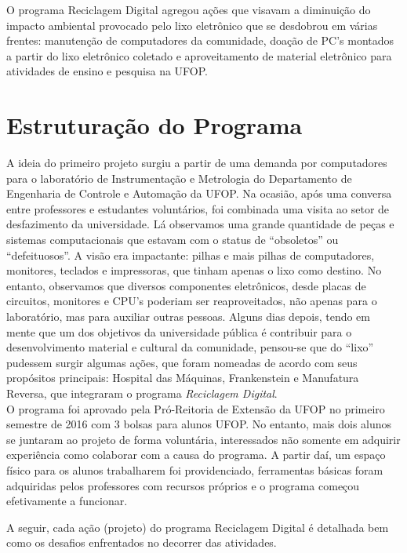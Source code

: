 \documentclass[a4paper]{ifacconf}
\begin{document}
O programa Reciclagem Digital agregou ações que visavam a diminuição do impacto ambiental provocado pelo lixo eletrônico que se desdobrou em várias frentes: manutenção de computadores da comunidade, doação de PC's montados a partir do lixo eletrônico coletado e aproveitamento de material eletrônico para atividades de ensino e pesquisa na UFOP.\\

\section{Estruturação do Programa}

A ideia do primeiro projeto surgiu a partir de uma demanda por computadores para o laboratório de Instrumentação e Metrologia do Departamento de Engenharia de Controle e Automação da UFOP. Na ocasião, após uma conversa entre professores e estudantes voluntários, foi combinada uma visita ao setor de desfazimento da universidade. Lá observamos uma grande quantidade de peças e sistemas computacionais que estavam com o status de ``obsoletos'' ou ``defeituosos''. A visão era impactante: pilhas e mais pilhas de computadores, monitores, teclados e impressoras, que tinham apenas o lixo como destino. No entanto, observamos que diversos componentes eletrônicos, desde placas de circuitos, monitores e CPU's poderiam ser reaproveitados, não apenas para o laboratório, mas para auxiliar outras pessoas. Alguns dias depois, tendo em mente que um dos objetivos da universidade pública é contribuir para o desenvolvimento material e cultural da comunidade, pensou-se que do ``lixo'' pudessem surgir algumas ações, que foram nomeadas de acordo com seus propósitos principais: Hospital das Máquinas, Frankenstein e Manufatura Reversa, que integraram o programa \emph{Reciclagem Digital}.\\

O programa foi aprovado pela Pró-Reitoria de Extensão da UFOP \citep{proex} no primeiro semestre de 2016 com 3 bolsas para alunos UFOP. No entanto, mais dois alunos se juntaram ao projeto de forma voluntária, interessados não somente em adquirir experiência como colaborar com a causa do programa. A partir daí, um espaço físico para os alunos trabalharem foi providenciado, ferramentas básicas foram adquiridas pelos professores com recursos próprios e o programa começou efetivamente a funcionar.

A seguir, cada ação (projeto) do programa Reciclagem Digital é detalhada bem como os desafios enfrentados no decorrer das atividades.
\end{document}

